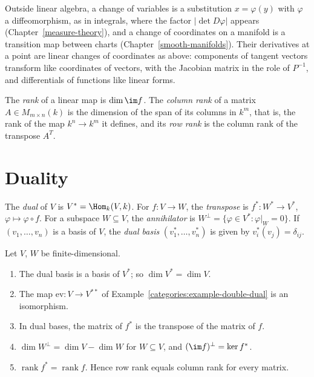 \begin{remark}
Outside linear algebra, a change of variables is a substitution $x = \varphi(y)$ with $\varphi$ a diffeomorphism, as in integrals, where the factor $|\det D\varphi|$ appears
(Chapter~\ref{measure-theory}), and a change of coordinates on a manifold is a transition map between charts (Chapter~\ref{smooth-manifolds}). Their derivatives at a point are linear changes of
coordinates as above: components of tangent vectors transform like coordinates of vectors, with the Jacobian matrix in the role of $P^{-1}$, and differentials of functions like linear forms.
\end{remark}
\begin{definition}\label{linear-algebra:definition-rank}
The \emph{rank} of a linear map is $\dim \im f$. The \emph{column rank} of a matrix
$A \in M_{m \times n}(k)$ is the dimension of the span of its columns in $k^m$, that is, the rank of
the map $k^n \to k^m$ it defines, and its \emph{row rank} is the column rank of the transpose
$A^T$.
\end{definition}

\section{Duality}\label{linear-algebra:section-duality}

\begin{definition}\label{linear-algebra:definition-dual}
The \emph{dual} of $V$ is $V^* = \Hom_k(V, k)$. For $f \colon V \to W$, the \emph{transpose} is
$f^* \colon W^* \to V^*$, $\varphi \mapsto \varphi \circ f$. For a subspace $W \subseteq V$, the \emph{annihilator}
is $W^\perp = \{\varphi \in V^* : \varphi|_W = 0\}$. If $(v_1, \ldots, v_n)$ is a basis of $V$, the \emph{dual
basis} $(v_1^*, \ldots, v_n^*)$ is given by $v_i^*(v_j) = \delta_{ij}$.
\end{definition}

\begin{proposition}\label{linear-algebra:proposition-duality}
Let $V$, $W$ be finite-dimensional.
\begin{enumerate}
\item The dual basis is a basis of $V^*$; so $\dim V^* = \dim V$.
\item The map $\mathrm{ev} \colon V \to V^{**}$ of Example~\ref{categories:example-double-dual} is an
isomorphism.
\item In dual bases, the matrix of $f^*$ is the transpose of the matrix of $f$.
\item $\dim W^\perp = \dim V - \dim W$ for $W \subseteq V$, and $(\im f)^\perp = \ker f^*$.
\item $\operatorname{rank} f^* = \operatorname{rank} f$. Hence row rank equals column rank for every matrix.
\end{enumerate}
\end{proposition}

